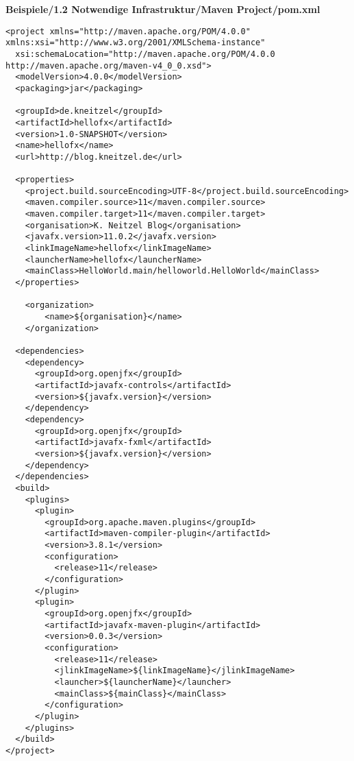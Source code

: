 \textbf{Beispiele/1.2 Notwendige Infrastruktur/Maven Project/pom.xml}
\begin{lstlisting}
<project xmlns="http://maven.apache.org/POM/4.0.0" xmlns:xsi="http://www.w3.org/2001/XMLSchema-instance"
  xsi:schemaLocation="http://maven.apache.org/POM/4.0.0 http://maven.apache.org/maven-v4_0_0.xsd">
  <modelVersion>4.0.0</modelVersion>
  <packaging>jar</packaging>

  <groupId>de.kneitzel</groupId>
  <artifactId>hellofx</artifactId>
  <version>1.0-SNAPSHOT</version>
  <name>hellofx</name>
  <url>http://blog.kneitzel.de</url>

  <properties>
    <project.build.sourceEncoding>UTF-8</project.build.sourceEncoding>    
	<maven.compiler.source>11</maven.compiler.source>
    <maven.compiler.target>11</maven.compiler.target>
    <organisation>K. Neitzel Blog</organisation>
    <javafx.version>11.0.2</javafx.version>
    <linkImageName>hellofx</linkImageName>
    <launcherName>hellofx</launcherName>
    <mainClass>HelloWorld.main/helloworld.HelloWorld</mainClass>
  </properties>

    <organization>
        <name>${organisation}</name>
    </organization>

  <dependencies>
    <dependency>
      <groupId>org.openjfx</groupId>
      <artifactId>javafx-controls</artifactId>
      <version>${javafx.version}</version>
    </dependency>
    <dependency>
      <groupId>org.openjfx</groupId>
      <artifactId>javafx-fxml</artifactId>
      <version>${javafx.version}</version>
    </dependency>
  </dependencies>
  <build>
    <plugins>
      <plugin>
        <groupId>org.apache.maven.plugins</groupId>
        <artifactId>maven-compiler-plugin</artifactId>
        <version>3.8.1</version>
        <configuration>
          <release>11</release>
        </configuration>
      </plugin>
      <plugin>
        <groupId>org.openjfx</groupId>
        <artifactId>javafx-maven-plugin</artifactId>
        <version>0.0.3</version>
        <configuration>
          <release>11</release>
          <jlinkImageName>${linkImageName}</jlinkImageName>
          <launcher>${launcherName}</launcher>
          <mainClass>${mainClass}</mainClass>
        </configuration>
      </plugin>
    </plugins>
  </build>
</project>
\end{lstlisting}

